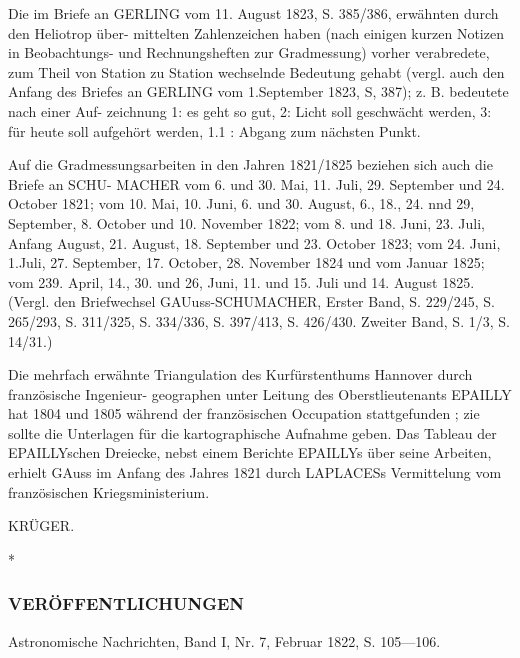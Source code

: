 \documentclass[12pt,a4paper]{article}
\theoremstyle{plain}
\theoremstyle{definition}
\theoremstyle{remark}
\begin{document}
\noindent
Die im Briefe an GERLING vom 11. August 1823, S. 385/386, erwähnten durch den Heliotrop über-
mittelten Zahlenzeichen haben (nach einigen kurzen Notizen in Beobachtungs- und Rechnungsheften zur
Gradmessung) vorher verabredete, zum Theil von Station zu Station wechselnde Bedeutung gehabt (vergl.
auch den Anfang des Briefes an GERLING vom 1.September 1823, S, 387); z. B. bedeutete nach einer Auf-
zeichnung 1: es geht so gut, 2: Licht soll geschwächt werden, 3: für heute soll aufgehört werden, 1.1 :
Abgang zum nächsten Punkt.

\noindent
Auf die Gradmessungsarbeiten in den Jahren 1821/1825 beziehen sich auch die Briefe an SCHU-
MACHER vom 6. und 30. Mai, 11. Juli, 29. September und 24. October 1821; vom 10. Mai, 10. Juni, 6. und
30. August, 6., 18., 24. nnd 29, September, 8. October und 10. November 1822; vom 8. und 18. Juni, 23. Juli,
Anfang August, 21. August, 18. September und 23. October 1823; vom 24. Juni, 1.Juli, 27. September,
17. October, 28. November 1824 und vom Januar 1825; vom 239. April, 14., 30. und 26, Juni, 11. und 15. Juli
und 14. August 1825. (Vergl. den Briefwechsel GAUuss-SCHUMACHER, Erster Band, S. 229/245, S. 265/293,
S. 311/325, S. 334/336, S. 397/413, S. 426/430. Zweiter Band, S. 1/3, S. 14/31.)

\noindent
Die mehrfach erwähnte Triangulation des Kurfürstenthums Hannover durch französische Ingenieur-
geographen unter Leitung des Oberstlieutenants EPAILLY hat 1804 und 1805 während der französischen
Occupation stattgefunden ; zie sollte die Unterlagen für die kartographische Aufnahme geben. Das Tableau
der EPAILLYschen Dreiecke, nebst einem Berichte EPAILLYs über seine Arbeiten, erhielt GAuss im Anfang
des Jahres 1821 durch LAPLACESs Vermittelung vom französischen Kriegsministerium.

\noindent
KRÜGER.

*

\noindent

\noindent

\subsubsection*{VERÖFFENTLICHUNGEN}

\noindent

\noindent
Astronomische Nachrichten, Band I, Nr. 7, Februar 1822, S. 105---106.
\end{document}
